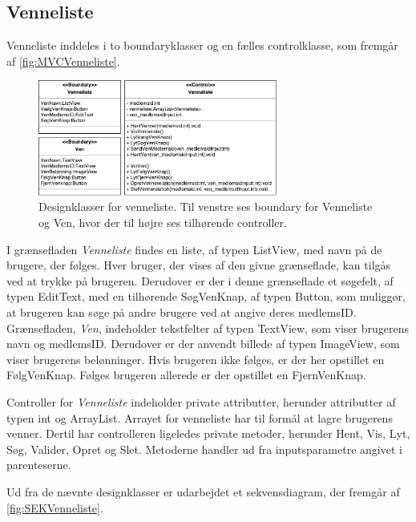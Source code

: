 \subsection*{Venneliste}
Venneliste inddeles i to boundaryklasser og en fælles controlklasse, som fremgår af \autoref{fig:MVCVenneliste}. 

\begin{figure} [H]
\centering
\includegraphics[width=0.7\textwidth]{figures/MVC/MVCVenneliste}
\caption{Designklasser for venneliste. Til venstre ses boundary for Venneliste og Ven, hvor der til højre ses tilhørende controller.}
\label{fig:MVCVenneliste}
\end{figure}

\noindent
I grænsefladen \textit{Venneliste} findes en liste, af typen ListView, med navn på de brugere, der følges. Hver bruger, der vises af den givne grænseflade, kan tilgås ved at trykke på brugeren. Derudover er der i denne grænseflade et søgefelt, af typen EditText, med en tilhørende SøgVenKnap, af typen Button, som muliggør, at brugeren kan søge på andre brugere ved at angive deres medlemsID. 
Grænsefladen, \textit{Ven}, indeholder tekstfelter af typen TextView, som viser brugerens navn og medlemsID. Derudover er der anvendt billede af typen ImageView, som viser brugerens belønninger. Hvis brugeren ikke følges, er der her opstillet en FølgVenKnap. Følges brugeren allerede er der opstillet en FjernVenKnap. 

Controller for \textit{Venneliste} indeholder private attributter, herunder attributter af typen int og ArrayList. Arrayet for venneliste har til formål at lagre brugerens venner. Dertil har controlleren ligeledes private metoder, herunder Hent, Vis, Lyt, Søg, Valider, Opret og Slet. Metoderne handler ud fra inputsparametre angivet i parenteserne. 

Ud fra de nævnte designklasser er udarbejdet et sekvensdiagram, der fremgår af \autoref{fig:SEKVenneliste}.

